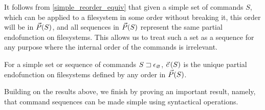 It follows from \cref{simple_reorder_equiv} that given a simple set of commands $S$,
which can be applied to a filesystem in some order without breaking it,
this order will be in $\vec{P}({S})$,
and all sequences in $\vec{P}({S})$
represent the same partial endofunction on filesystems.
This allows us to treat such a set as a sequence for any purpose
where the internal order of the commands is irrelevant.
\begin{mydef}[$\ordp{S}$]
For a simple set or sequence of commands ${S}\sqsupset\epsilon_\varnothing$,
$\ordp{S}$ is the unique partial endofunction on filesystems
defined by any order in $\vec{P}({S})$.
\end{mydef}


Building on the results above, we finish by proving an important result,
namely, that command sequences can be made simple using syntactical operations.

